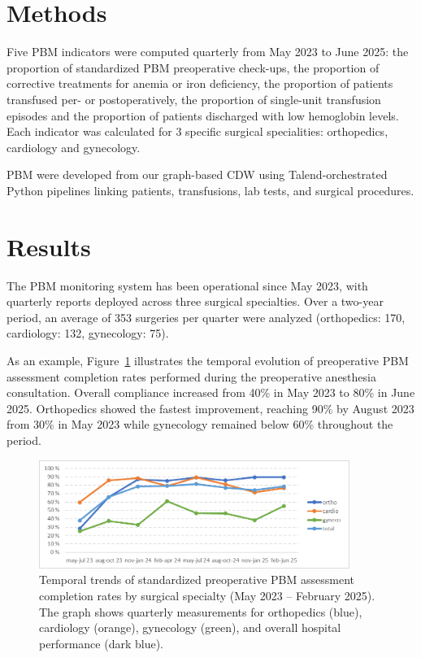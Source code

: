 \documentclass{IOS-Book-Article}
\begin{document}
\section{Methods}

Five PBM indicators were computed quarterly from May 2023 to June 2025: the proportion of standardized PBM preoperative check-ups, the proportion of corrective treatments for anemia or iron deficiency, the proportion of patients transfused per- or postoperatively, the proportion of single-unit transfusion episodes and the proportion of patients discharged with low hemoglobin levels. Each indicator was calculated for 3 specific surgical specialities: orthopedics, cardiology and gynecology. 

PBM were developed from our graph-based CDW \cite{Cance2022,Artemova2019}
using Talend-orchestrated Python pipelines linking patients, transfusions, lab tests, and surgical procedures.

\section{Results}

The PBM monitoring system has been operational since May 2023, with quarterly 
reports deployed across three surgical specialties. Over a two-year period, an 
average of 353 surgeries per quarter were analyzed (orthopedics: 170, 
cardiology: 132, gynecology: 75).

As an example, Figure~\ref{fig:pbm_trends} illustrates the temporal evolution of preoperative 
PBM assessment completion rates performed during the preoperative anesthesia consultation. Overall compliance increased from 40\% in May 2023 to 80\% in June 2025. Orthopedics showed the fastest improvement, reaching 90\% by August 2023 from 30\% in May 2023 while gynecology remained below 60\% throughout the period.

\begin{figure}[h!]
\centering
\includegraphics[width=0.9\textwidth]{figure.png}
\caption{Temporal trends of standardized preoperative PBM assessment completion rates by surgical specialty (May 2023 -- February 2025). The graph shows quarterly measurements for orthopedics (blue), cardiology (orange), gynecology (green), and overall hospital performance (dark blue).}
\label{fig:pbm_trends}
\vspace{-1em}
\end{figure}
\end{document}
